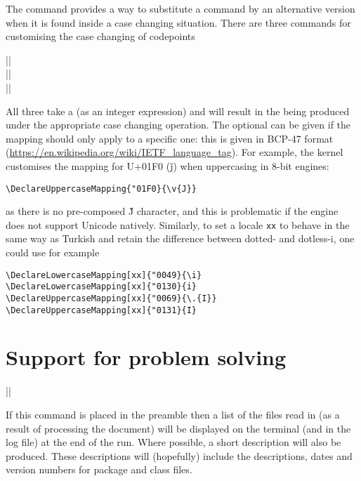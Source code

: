 \documentclass{ltxguide}
\begin{document}
The command  provides a way to substitute a
command by an alternative version when it is found inside a case changing
situation. There are three commands for customising the case changing of
codepoints
\begin{decl}
  |\DeclareLowercaseMapping|    \\
  |\DeclareTitlecaseMapping|    \\
  |\DeclareUppercaseMapping|   
\end{decl}
All three take a  (as an integer expression) and will
result in the  being produced under the appropriate case changing
operation. The optional  can be given if the mapping should only
apply to a specific one: this is given in BCP-47 format
(\url{https://en.wikipedia.org/wiki/IETF_language_tag}). For example,
the kernel customises the mapping for U+01F0 (\v{j}) when uppercasing in
8-bit engines:
\begin{verbatim}
\DeclareUppercaseMapping{"01F0}{\v{J}}
\end{verbatim}
as there is no pre-composed \v{J} character, and this is problematic if
the engine does not support Unicode natively. Similarly, to set a locale
\texttt{xx} to behave in the same way as Turkish and retain the difference
between dotted- and dotless-i, one could use for example
\begin{verbatim}
\DeclareLowercaseMapping[xx]{"0049}{\i}
\DeclareLowercaseMapping[xx]{"0130}{i}
\DeclareUppercaseMapping[xx]{"0069}{\.{I}}
\DeclareUppercaseMapping[xx]{"0131}{I}
\end{verbatim}

\section{Support for problem solving}

\begin{decl}
  |\listfiles| 
\end{decl}

If this command is placed in the preamble then a list of the files
read in (as a result of processing the document) will be displayed
on the terminal (and in the log file) at the end of the run. Where
possible, a short description will also be produced. These descriptions
will (hopefully) include the descriptions, dates and version numbers
for package and class files.
\end{document}
